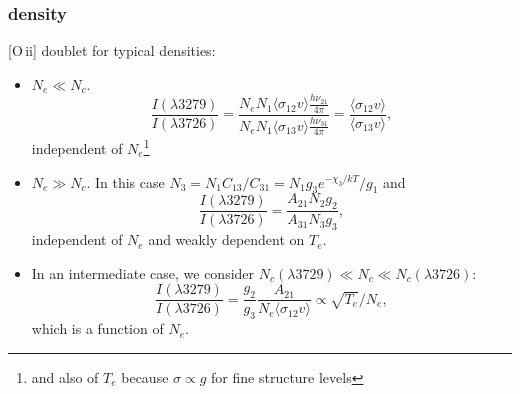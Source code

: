 \begin{frame}\frametitle{density}


[O\,{\sc ii}] doublet for typical densities:
\begin{itemize}
\item $N_e \ll N_c$. \[ \frac{I(\lambda 3279)}{I(\lambda 3726)} =\frac{ N_e
N_1  \langle \sigma_{12} v \rangle \frac{h\nu_{21}}{4\pi}}{ N_e
N_1  \langle \sigma_{13} v \rangle \frac{h\nu_{31}}{4\pi}} = \frac{ \langle
\sigma_{12} v  \rangle}{\langle \sigma_{13} v  \rangle},\] independent
of $N_e$\footnote{and also of  $T_e$ because  $\sigma \propto g$ for
fine structure levels}
\item $N_e \gg N_c$. In this case  $N_3 = N_1 C_{13}/C_{31} = N_1 g_3
e^{-\chi_3/kT} / g_1 $  and 
\[\frac{I(\lambda 3279)}{I(\lambda 3726)} = \frac{A_{21}
N_2 g_2 }{A_{31}N_3 g_3}, \] independent of  $N_e$ and weakly
dependent on $T_e$.
\item In an intermediate case, we consider  $N_c(\lambda 3729) \ll N_c
\ll N_c(\lambda 3726)$:
\[\frac{I(\lambda 3279)}{I(\lambda 3726)} = \frac{g_2}{g_3}
\frac{A_{21}}{N_e \langle \sigma_{12} v \rangle} \propto
\sqrt{T_e}/N_e,\]  which is a function of  $N_e$.
\end{itemize}


\end{frame}
